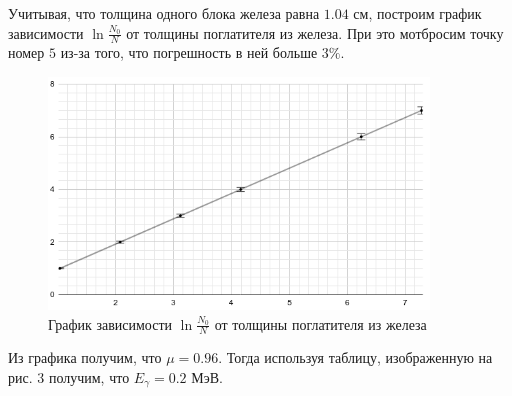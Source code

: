 \documentclass[a4paper,12pt]{article}
\theoremstyle{plain} %
\theoremstyle{definition} %
\theoremstyle{remark} %
\begin{document}
\begin{enumerate}
\begin{table}[h]
\caption{Зависимость числа частиц, попадающих на счетчик, от толщины поглотителя из железа}
\end{table}
Учитывая, что толщина одного блока железа равна $1.04$ см, построим график зависимости $\ln{\frac{N_0}{N}}$ от толщины поглатителя из железа. При это мотбросим точку номер $5$ из-за того, что погрешность в ней больше $3\%.$\par
\begin{figure}[h]
    \centering
    \includegraphics[width=0.9\textwidth]{chart2.png}
    \caption{График зависимости $\ln{\frac{N_0}{N}}$ от толщины поглатителя из железа}
    \label{fig:my_label}
\end{figure}
Из графика получим, что $\mu = 0.96.$ Тогда используя таблицу, изображенную на рис. 3 получим, что $E_\gamma = 0.2$ МэВ.

\end{enumerate}
\end{document}
